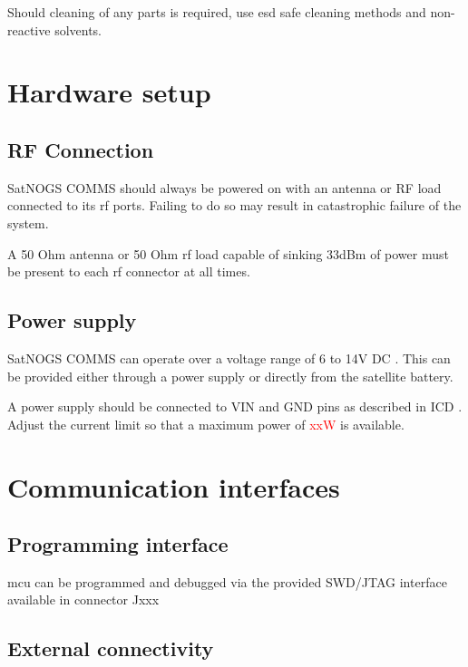 \documentclass[english,title,a4paper]{report}
\newcommand\TBD[1]{\textcolor{red}{#1}}
\begin{document}
Should cleaning of any parts is required, use \acrshort{esd} safe cleaning methods and non-reactive solvents.

\chapter{Hardware setup}\label{hardware-setup}

\section{RF Connection}\label{rf-connection}

SatNOGS COMMS should always be powered on with an antenna or RF load connected to its \acrshort{rf} ports.
Failing to do so may result in catastrophic failure of the system.

A 50 Ohm antenna or 50 Ohm \acrshort{rf} load capable of sinking 33dBm of power must be present to each \acrshort{rf} connector at all times.

\section{Power supply}\label{power-supply}

SatNOGS COMMS can operate over a voltage range of 6 to 14V DC \@.
This can be provided either through a power supply or directly from the satellite battery.

A power supply should be connected to VIN and GND pins as described in ICD \@.
Adjust the current limit so that a maximum power of \TBD{xxW} is available.

\chapter{Communication interfaces}\label{communication-interfaces}

\section{Programming interface}\label{programming-interface}

\acrshort{mcu} can be programmed and debugged via the provided SWD/JTAG interface available in connector Jxxx

\section{External connectivity}\label{external-connectivity}
\end{document}
